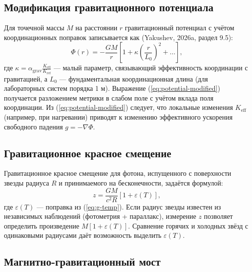 \documentclass[12pt]{article}
\theoremstyle{remark}
\newcommand{\Keff}{K_{\mathrm{eff}}}
\newcommand{\eps}{\varepsilon}
\begin{document}
	\subsection{Модификация гравитационного потенциала}
	\label{subsec:potential}
	
	Для точечной массы $M$ на расстоянии $r$ гравитационный потенциал с учётом координационных поправок записывается как (Yakushev, 2026a, раздел 9.5):
	\begin{equation}
		\Phi(r) = -\frac{GM}{r} \left[ 1 + \kappa \left( \frac{r}{L_0} \right)^2 + \dots \right],
		\label{eq:potential-modified}
	\end{equation}
	где $\kappa = \alpha_{\text{grav}} \frac{\Keff}{K_{\text{ref}}}$ — малый параметр, связывающий эффективность координации с гравитацией, а $L_0$ — фундаментальная координационная длина (для лабораторных систем порядка 1 м). Выражение (\ref{eq:potential-modified}) получается разложением метрики в слабом поле с учётом вклада поля координации. Из (\ref{eq:potential-modified}) следует, что локальные изменения $\Keff$ (например, при нагревании) приводят к изменению эффективного ускорения свободного падения $g = -\nabla \Phi$.
	
	\subsection{Гравитационное красное смещение}
	\label{subsec:redshift}
	
	Гравитационное красное смещение для фотона, испущенного с поверхности звезды радиуса $R$ и принимаемого на бесконечности, задаётся формулой:
	\begin{equation}
		z = \frac{GM}{c^2 R} \left[ 1 + \eps(T) \right],
		\label{eq:redshift}
	\end{equation}
	где $\eps(T)$ — поправка из (\ref{eq:g-temp}). Если радиус звезды известен из независимых наблюдений (фотометрия + параллакс), измерение $z$ позволяет определить произведение $M[1+\eps(T)]$. Сравнение горячих и холодных звёзд с одинаковыми радиусами даёт возможность выделить $\eps(T)$.
	
	\subsection{Магнитно-гравитационный мост}
	\label{subsec:magnetism-gravity}
	
\end{document}

